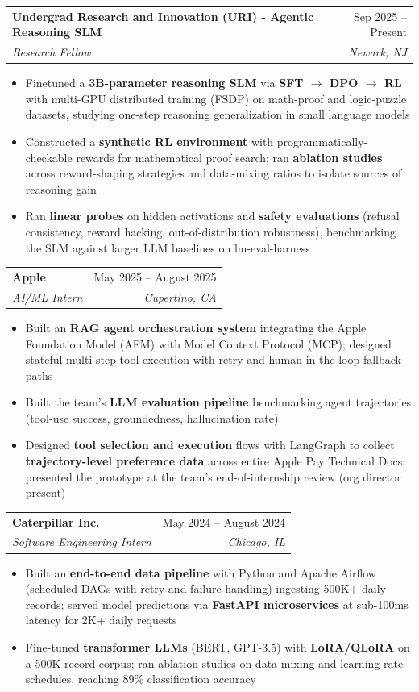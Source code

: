 \documentclass[letterpaper,10pt]{article}
\makeatletter
\newcommand{\resumeItem}[1]{
  \item\small{
    {#1 \vspace{-3pt}}
  }
}
\newcommand{\resumeSubheading}[4]{
  \vspace{-3pt}\item
    \begin{tabular*}{0.97\textwidth}[t]{l@{\extracolsep{\fill}}r}
      \textbf{#1} & #2 \\
      \textit{\small#3} & \textit{\small #4} \\
    \end{tabular*}\vspace{-9pt}
}
\newcommand{\resumeItemListStart}{\begin{itemize}}
\newcommand{\resumeItemListEnd}{\end{itemize}\vspace{-7pt}}
\makeatother
\begin{document}
\vspace{5pt}
\resumeSubheading
{Undergrad Research and Innovation (URI) - Agentic Reasoning SLM}{Sep 2025 -- Present}
{Research Fellow}{Newark, NJ}
\vspace{5pt}
\resumeItemListStart
\resumeItem{Finetuned a \textbf{3B-parameter reasoning SLM} via \textbf{SFT $\rightarrow$ DPO $\rightarrow$ RL} with multi-GPU distributed training (FSDP) on math-proof and logic-puzzle datasets, studying one-step reasoning generalization in small language models}
\resumeItem{Constructed a \textbf{synthetic RL environment} with programmatically-checkable rewards for mathematical proof search; ran \textbf{ablation studies} across reward-shaping strategies and data-mixing ratios to isolate sources of reasoning gain}
\resumeItem{Ran \textbf{linear probes} on hidden activations and \textbf{safety evaluations} (refusal consistency, reward hacking, out-of-distribution robustness), benchmarking the SLM against larger LLM baselines on lm-eval-harness}
\resumeItemListEnd
\vspace{5pt}
\resumeSubheading
{Apple}{May 2025 -- August 2025}
{AI/ML Intern}{Cupertino, CA}
\vspace{5pt}
\resumeItemListStart
\resumeItem{Built an \textbf{RAG agent orchestration system} integrating the Apple Foundation Model (AFM) with Model Context Protocol (MCP); designed stateful multi-step tool execution with retry and human-in-the-loop fallback paths}
\resumeItem{Built the team's \textbf{LLM evaluation pipeline} benchmarking agent trajectories (tool-use success, groundedness, hallucination rate)}
\resumeItem{Designed \textbf{tool selection and execution} flows with LangGraph to collect \textbf{trajectory-level preference data} across entire Apple Pay Technical Docs; presented the prototype at the team's end-of-internship review (org director present)}
\resumeItemListEnd


\vspace{5pt}
\resumeSubheading
{Caterpillar Inc.}{May 2024 -- August 2024}
{Software Engineering Intern}{Chicago, IL}
\vspace{5pt}
\resumeItemListStart
\resumeItem{Built an \textbf{end-to-end data pipeline} with Python and Apache Airflow (scheduled DAGs with retry and failure handling) ingesting 500K+ daily records; served model predictions via \textbf{FastAPI microservices} at sub-100ms latency for 2K+ daily requests}
\resumeItem{Fine-tuned \textbf{transformer LLMs} (BERT, GPT-3.5) with \textbf{LoRA/QLoRA} on a 500K-record corpus; ran ablation studies on data mixing and learning-rate schedules, reaching 89\% classification accuracy}
\resumeItemListEnd
\end{document}
